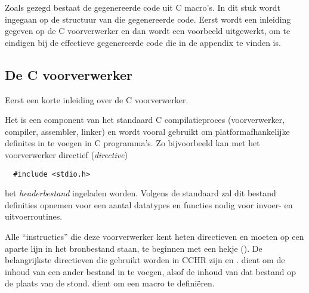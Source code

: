 {Zoals gezegd bestaat de gegenereerde code uit C macro's. In dit stuk wordt ingegaan op de structuur van die gegenereerde code. Eerst wordt een inleiding gegeven op de C voorverwerker en dan wordt een voorbeeld uitgewerkt, om te eindigen bij de effectieve gegenereerde code die in de appendix te vinden is.

\subsection{De C voorverwerker} \label{sec:preproc}

Eerst een korte inleiding over de C voorverwerker.

Het is een component van het standaard C compilatieproces (voorverwerker, compiler, assembler, linker) en wordt vooral gebruikt om platformafhankelijke definites in te voegen in C programma's. Zo bijvoorbeeld kan met het voorverwerker directief ({\em directive}) \begin{Verbatim}
  #include <stdio.h>
\end{Verbatim}
het {\em headerbestand}  ingeladen worden. Volgens de standaard zal dit bestand definities opnemen voor een aantal datatypes en functies nodig voor invoer- en uitvoerroutines. 

Alle ``instructies'' die deze voorverwerker kent heten directieven en moeten op een aparte lijn in het bronbestand staan, te beginnen met een hekje (\code{\#}). De belangrijkste directieven die gebruikt worden in CCHR zijn  en .  dient om de inhoud van een ander bestand in te voegen, alsof de inhoud van dat bestand op de plaats van de  stond.  dient om een macro te defini\"eren.

}
